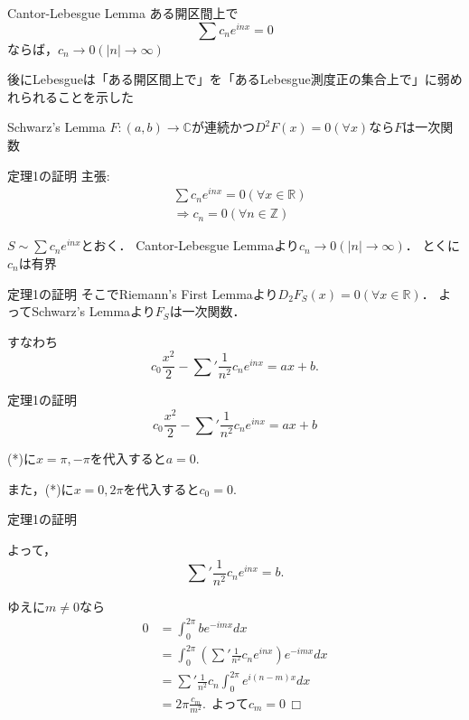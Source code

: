 \documentclass[dvipdfmx,17pt]{beamer}
\theoremstyle{plain}
\newcommand{\Z}{\mathbb{Z}}
\newcommand{\R}{\mathbb{R}}
\newcommand{\C}{\mathbb{C}}
\begin{document}

\begin{frame}{Cantor-Lebesgue Lemma}
ある開区間上で
\[\sum c_n e^{inx} = 0\]
ならば，$c_n \to 0 (|n| \to \infty)$

\vspace{1cm}
{\footnotesize 後にLebesgueは「ある開区間上で」を「あるLebesgue測度正の集合上で」に弱めれられることを示した}
\end{frame}

\begin{frame}{Schwarz's Lemma}
$F: (a, b) \to \C$が連続かつ$D^2F(x) = 0 (\forall x)$なら$F$は一次関数
\end{frame}

\begin{frame}{定理1の証明}
主張:
\begin{align*}
& \sum c_n e^{inx} = 0 (\forall x \in \R) \\
& \Rightarrow c_n = 0 (\forall n \in \Z)
\end{align*}

$S \sim \sum c_n e^{inx}$とおく．
Cantor-Lebesgue Lemmaより$c_n \to 0 (|n| \to \infty)$．
とくに$c_n$は有界
\end{frame}

\begin{frame}{定理1の証明}
そこでRiemann's First Lemmaより$D_2F_S(x) = 0 (\forall x\in\R)$．
よってSchwarz's Lemmaより$F_S$は一次関数．

すなわち
\[c_0 \frac{x^2}{2} - {\sum}' \frac{1}{n^2} c_n e^{inx} = ax + b.\]
\end{frame}

\begin{frame}{定理1の証明}
\[c_0 \frac{x^2}{2} - {\sum}' \frac{1}{n^2} c_n e^{inx} = ax + b \tag{*}\]

(*)に$x=\pi, -\pi$を代入すると$a = 0.$

また，(*)に$x=0, 2\pi$を代入すると$c_0 = 0.$
\end{frame}

\begin{frame}{定理1の証明}

{\small
よって，
\[{\sum}' \frac{1}{n^2} c_n e^{inx} = b.\]

ゆえに$m \ne 0$なら
\begin{align*}
0 &= \int_0^{2\pi} b e^{-imx} dx \\
&= \int_0^{2\pi} ({\sum}' \frac{1}{n^2} c_n e^{inx}) e^{-imx} dx \\
&= {\sum}' \frac{1}{n^2} c_n \int_0^{2\pi} e^{i(n - m)x} dx \\
&= 2\pi \frac{c_m}{m^2}. \ \ \text{よって} c_m = 0 \ \ \text{□}
\end{align*}
}
\end{frame}
\end{document}
